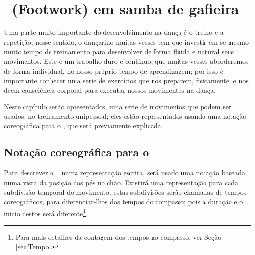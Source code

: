 

\chapter{ \Footwork~(Footwork) em samba de gafieira }

Uma parte muito importante do desenvolvimento na dança é o treino e a repetição;
nesse sentido, o dançarino muitas vesses tem que investir em se mesmo muito tempo 
de treinamento para desenvolver de forma fluida e natural seus movimentos.
Este é um trabalho duro e contínuo, que muitas vesses abordaremos de forma individual, 
no nosso próprio tempo de aprendizagem; 
por isso é importante conhecer uma serie de exercícios que nos preparem,
fisicamente, e nos deem consciência corporal para executar nossos movimentos na dança.

Neste capítulo serão apresentados, uma serie de movimentos que podem ser usados,
no treinamento unipessoal; eles estão representados usando uma notação coreográfica
para o \footwork, que será previamente explicada.
 
\section{Notação coreográfica para o \footwork }
Para descrever o \footwork~ numa representação escrita, 
será usado uma notação baseada numa vista da posição dos pés no chão. 
Existirá uma representação para cada subdivisão temporal do movimento, 
estas subdivisões serão chamadas de tempos coreográficos, 
para diferenciar-lhos dos tempos do compasso; 
pois a duração e o inicio destos será diferente\footnote{Para 
mais detalhes da contagem dos tempos no compasso, ver Seção \ref{sec:Tempo}.}.

